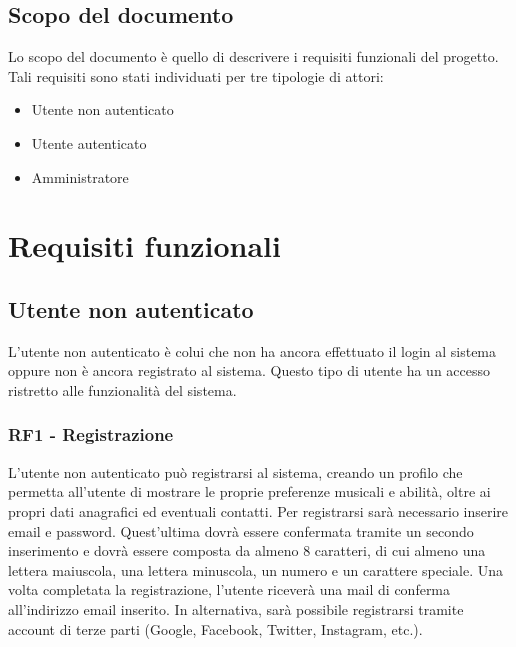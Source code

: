 \documentclass[12pt, a4paper]{article}
\begin{document}
\subsection{Scopo del documento}

Lo scopo del documento è quello di descrivere i requisiti funzionali del progetto.
Tali requisiti sono stati individuati per tre tipologie di attori:
\begin{itemize}
    \item Utente non autenticato
    \item Utente autenticato
    \item Amministratore
\end{itemize}

\section{Requisiti funzionali}

\subsection{Utente non autenticato}

L'utente non autenticato è colui che non ha ancora effettuato il login al sistema oppure non è ancora registrato al sistema. Questo tipo di utente ha un accesso ristretto alle funzionalità del sistema.

\subsubsection{RF1 - Registrazione}

L'utente non autenticato può registrarsi al sistema, creando un profilo che permetta all'utente di mostrare le proprie preferenze musicali e abilità, oltre ai propri dati anagrafici ed eventuali contatti. Per registrarsi sarà necessario inserire email e password.
Quest'ultima dovrà essere confermata tramite un secondo inserimento e dovrà essere composta da almeno 8 caratteri, di cui almeno una lettera maiuscola, una lettera minuscola, un numero e un carattere speciale. Una volta completata la registrazione, l'utente riceverà una mail di conferma all'indirizzo email inserito. In alternativa, sarà possibile registrarsi tramite account di terze parti (Google, Facebook, Twitter, Instagram, etc.).


\end{document}

